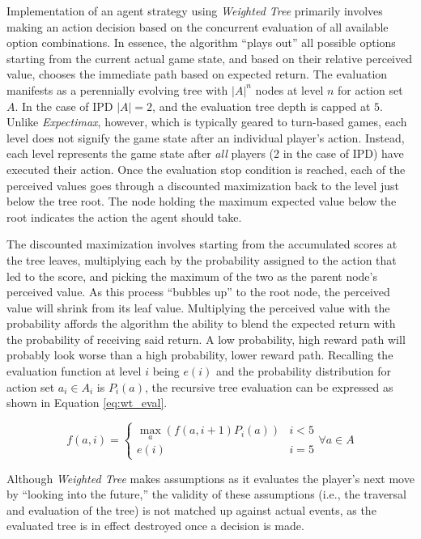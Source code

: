 \documentclass[10pt]{article}
\begin{document}
Implementation of an agent strategy using \emph{Weighted Tree} primarily involves making an action decision based on the concurrent evaluation of all available option combinations. In essence, the algorithm ``plays out'' all possible options starting from the current actual game state, and based on their relative perceived value, chooses the immediate path based on expected return. The evaluation manifests as a perennially evolving tree with $|A|^n$ nodes at level $n$ for action set $A$. In the case of IPD $|A|=2$, and the evaluation tree depth is capped at $5$. Unlike \emph{Expectimax}, however, which is typically geared to turn-based games, each level does not signify the game state after an individual player's action. Instead, each level represents the game state after \emph{all} players (2 in the case of IPD) have executed their action. Once the evaluation stop condition is reached, each of the perceived values goes through a discounted maximization back to the level just below the tree root. The node holding the maximum expected value below the root indicates the action the agent should take.\par

The discounted maximization involves starting from the accumulated scores at the tree leaves, multiplying each by the probability assigned to the action that led to the score, and picking the maximum of the two as the parent node's perceived value. As this process ``bubbles up'' to the root node, the perceived value will shrink from its leaf value. Multiplying the perceived value with the probability affords the algorithm the ability to blend the expected return with the probability of receiving said return. A low probability, high reward path will probably look worse than a high probability, lower reward path. Recalling the evaluation function at level $i$ being $e(i)$ and the probability distribution for action set $a_i \in A_i$ is $P_i(a)$, the recursive tree evaluation can be expressed as shown in Equation \ref{eq:wt_eval}.\par

\begin{equation}
    f(a, i) =
    \begin{cases}
        \max\limits_a (f(a, i + 1)P_i(a)) & i < 5 \\
        e(i) & i = 5
    \end{cases}
    \forall a \in A
    \label{eq:wt_eval}
\end{equation}

Although \emph{Weighted Tree} makes assumptions as it evaluates the player's next move by ``looking into the future,'' the validity of these assumptions (i.e., the traversal and evaluation of the tree) is not matched up against actual events, as the evaluated tree is in effect destroyed once a decision is made.\par
\end{document}
